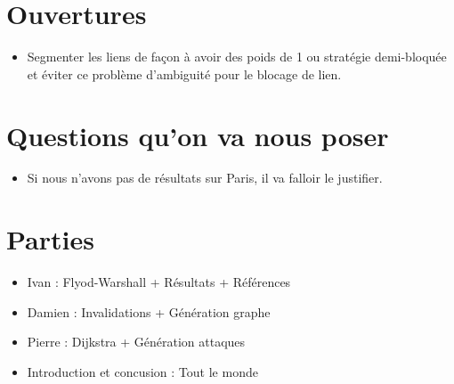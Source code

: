 \documentclass{article}
\begin{document}
\section*{Ouvertures}
	\begin{itemize}
		\item Segmenter les liens de façon à avoir des poids de 1 ou stratégie demi-bloquée et éviter ce problème d'ambiguité pour le blocage de lien.
	\end{itemize}

\section*{Questions qu'on va nous poser}
	\begin{itemize}
		\item Si nous n'avons pas de résultats sur Paris, il va falloir le justifier.
	\end{itemize}

\section*{Parties}
	\begin{itemize}
		\item Ivan : Flyod-Warshall + Résultats + Références
		\item Damien : Invalidations + Génération graphe
		\item Pierre : Dijkstra + Génération attaques
		\item Introduction et concusion : Tout le monde
	\end{itemize}
\end{document}
